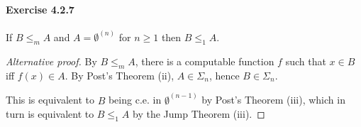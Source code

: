 \documentclass[a4paper,11pt]{article}
\begin{document}
\paragraph{Exercise 4.2.7}

If $B \leq_m A$ and $A = \emptyset^{(n)}$ for $n \geq 1$ then $B \leq_1 A$.
\begin{proof}[Alternative proof]
By $B \leq_m A$, there is a computable function $f$ such that $x \in B$ iff $f(x) \in A$.
By Post's Theorem (ii), $A \in \Sigma_n$, hence $B \in \Sigma_n$.

This is equivalent to $B$ being c.e. in $\emptyset^{(n-1)}$ by Post's Theorem (iii), which in turn is equivalent to $B \leq_1 A$ by the Jump Theorem (iii).
\end{proof}
\end{document}
